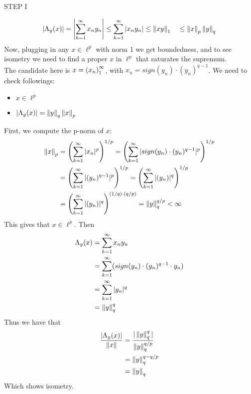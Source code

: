 \begin{theorem}
\begin{pf}{STEP I}{}
\begin{comment}
	\end{equation}
	\end{comment}
	\begin{equation}
		\left|\Lambda_y(x)\right|=\left|\sum_{k=1}^{\infty}x_ny_n\right|
		\leq\sum_{k=1}^{\infty}|x_ny_n|
		\leq\left\|{xy}\right\|_1
		\quad\leq\left\|{x}\right\|_p\left\|{y}\right\|_q
	\end{equation}
	Now, plugging in any $x\in\ell^p$ with norm 1 we get boundedness, and to see isometry we need to find a proper $x$ in $\ell^p$ that saturates the supremum.\\
	The candidate here is $x=\left({x_n}\right)_1^\infty$, with $x_n=sign(y_n)\cdot(y_n)^{q-1}$. We need to check followings:
	\begin{itemize}
		\item $x\in\ell^p$
		\item $|\Lambda_y(x)|=\left\|{y}\right\|_q\left\|{x}\right\|_p$
	\end{itemize}
	First, we compute the p-norm of $x$:
	\begin{equation}
		\begin{split}
			\left\|{x}\right\|_p&=\left(\sum_{k=1}^\infty |x_n|^p\right)^{1/p}=\left(\sum_{k=1}^\infty |sign(y_n)\cdot(y_n)^{q-1}|^p\right)^{1/p}\\
			&=\left(\sum_{k=1}^\infty |(y_n)^{q-1}|^p\right)^{1/p}=\left(\sum_{k=1}^\infty |(y_n)|^q\right)^{1/p}\\
			&=\left(\sum_{k=1}^\infty |(y_n)|^q\right)^{(1/q)\cdot (q/p)}=\left\|{y}\right\|_q^{q/p}<\infty
		\end{split}
	\end{equation}
	This gives that $x\in\ell^p$. Then
	\begin{equation}
		\begin{split}
			\Lambda_y(x)&=\sum_{k=1}^{\infty}x_ny_n\\
			&=\sum_{k=1}^{\infty}(sign(y_n)\cdot(y_n)^{q-1}\cdot y_n)\\
			&=\sum_{k=1}^{\infty}|y_n|^q\\
			&=\left\|{y}\right\|_q^q
		\end{split}
	\end{equation}
	Thus we have that 
	\begin{equation}
		\begin{split}
			\frac{|\Lambda_y(x)|}{\left\|{x}\right\|}&=\frac{|\left\|{y}\right\|_q^q|}{\left\|{y}\right\|_q^{q/p}}\\
			&=\left\|{y}\right\|_q^{q-{q/p}}\\
			&=\left\|{y}\right\|_q
		\end{split}
	\end{equation}
	Which shows isometry. \\

\end{pf}
\end{theorem}
